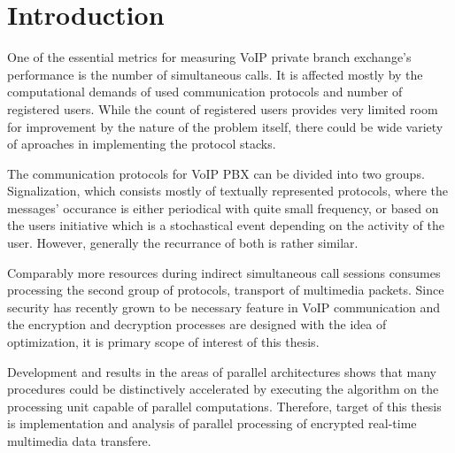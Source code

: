 
\chapter{Introduction}
One of the essential metrics for measuring VoIP private branch exchange's 
performance is the number of simultaneous calls. It is affected mostly by the
computational demands of used communication protocols and number of registered
users. While the count of registered users provides very limited room for 
improvement by the nature of the problem itself, there could be wide variety
of aproaches in implementing the protocol stacks. 

The communication protocols for VoIP PBX can be divided into two groups. 
Signalization, which consists mostly of textually represented protocols, where 
the messages' occurance is either periodical with quite small frequency, or 
based on the users initiative which is a stochastical event depending on the 
activity of the user. However, generally the recurrance of both is rather 
similar.

Comparably more resources during indirect simultaneous call sessions consumes 
processing the second group of protocols, transport of multimedia packets. Since
security has recently grown to be necessary feature in VoIP communication and 
the encryption and decryption processes are designed with the idea of 
optimization, it is primary scope of interest of this thesis.

Development and results in the areas of parallel architectures shows that many
procedures could be distinctively accelerated by executing the algorithm on the
processing unit capable of parallel computations. Therefore, target of this 
thesis is implementation and analysis of parallel processing of encrypted
real-time multimedia data transfere.

